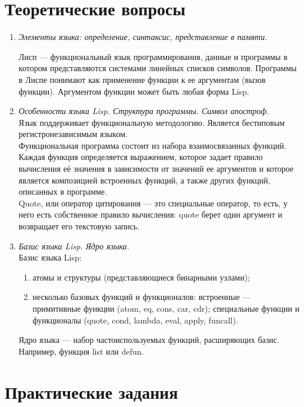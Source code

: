 \chapter{Теоретические вопросы}
\begin{enumerate}[wide=0pt]
	\item \textit{Элементы языка: определение, синтаксис, представление в памяти.} 
	
	
Лисп --- функциональный язык программирования, данные и программы в котором представляются системами линейных списков символов. Программы в Лиспе понимают как применение функции к ее аргументам (вызов функции). Аргументом функции может быть любая форма Lisp.
	\item \textit{Особенности языка Lisp. Структура программы. Символ апостроф.} \\
	
	Язык поддерживает функциональную методологию. Является бестиповым регистронезависимым языком.\\
	
	Функциональная программа состоит из набора взаимосвязанных функций. Каждая функция определяется выражением, которое задает правило вычисления её значения в зависимости от значений ее аргументов и которое является композицией встроенных функций, а также других функций, описанных в программе. \\
	
	Quote, или оператор цитирования --- это специальные оператор, то есть, у него есть собственное правило вычисления: quote берет один аргумент и возвращает его текстовую запись. 
	
	\item \textit{Базис языка Lisp. Ядро языка.} \\
	Базис языка Lisp:
	\begin{enumerate}
		\item атомы и структуры (представляющиеся бинарными узлами);
		\item несколько базовых функций и функционалов: встроенные --- примитивные функции (atom, eq, cons, car, cdr); специальные функции и функционалы (quote, cond, lambda, eval, apply, funcall).
	\end{enumerate}
	Ядро языка --- набор частоиспользуемых функций, расширяющих базис. Например, функция list или defun. 
\end{enumerate}
\chapter{Практические задания}

